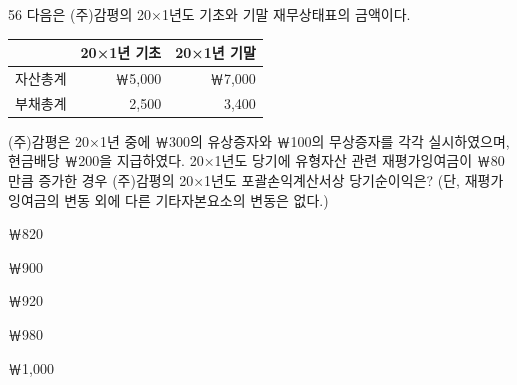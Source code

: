 \begin{question}{56}
다음은 (주)감평의 20×1년도 기초와 기말 재무상태표의 금액이다.
\par{\small\centering\begin{tabular}{|c|r|r|}\hline
 & 20×1년 기초 & 20×1년 기말 \\ \hline
자산총계 & ￦5,000 & ￦7,000 \\
부채총계 & 2,500 & 3,400 \\ \hline
\end{tabular}\par}
(주)감평은 20×1년 중에 ￦300의 유상증자와 ￦100의 무상증자를 각각 실시하였으며, 현금배당 ￦200을 지급하였다. 20×1년도 당기에 유형자산 관련 재평가잉여금이 ￦80만큼 증가한 경우 (주)감평의 20×1년도 포괄손익계산서상 당기순이익은? (단, 재평가잉여금의 변동 외에 다른 기타자본요소의 변동은 없다.)
\begin{choices}
  \item ￦820
  \item ￦900
  \item ￦920
  \item ￦980
  \item ￦1,000
\end{choices}
\end{question}
